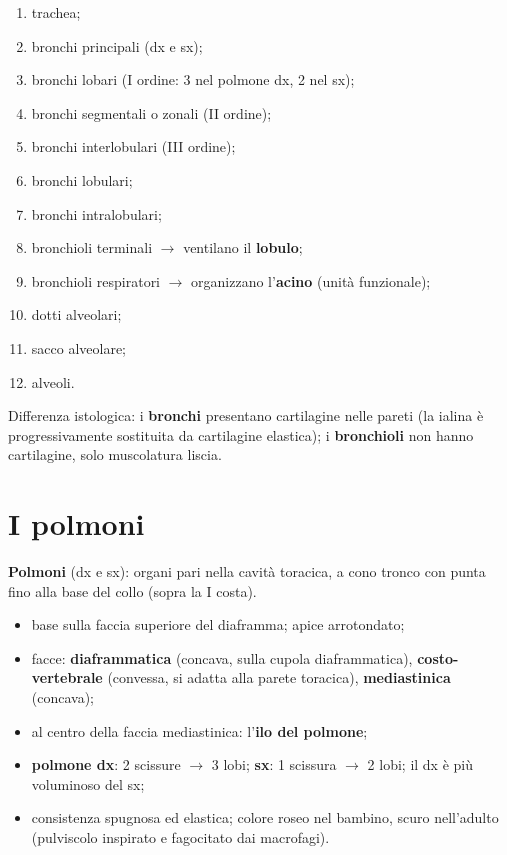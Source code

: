 \begin{enumerate}
  \item trachea;
  \item bronchi principali (dx e sx);
  \item bronchi lobari (I ordine: 3 nel polmone dx, 2 nel sx);
  \item bronchi segmentali o zonali (II ordine);
  \item bronchi interlobulari (III ordine);
  \item bronchi lobulari;
  \item bronchi intralobulari;
  \item bronchioli terminali $\rightarrow$ ventilano il \textbf{lobulo};
  \item bronchioli respiratori $\rightarrow$ organizzano l'\textbf{acino} (unità funzionale);
  \item dotti alveolari;
  \item sacco alveolare;
  \item alveoli.
\end{enumerate}
Differenza istologica: i \textbf{bronchi} presentano cartilagine nelle pareti (la ialina è
progressivamente sostituita da cartilagine elastica); i \textbf{bronchioli} non hanno cartilagine,
solo muscolatura liscia.

\section{I polmoni}

\textbf{Polmoni} (dx e sx): organi pari nella cavità toracica, a cono tronco con punta fino alla base
del collo (sopra la I costa).
\begin{itemize}
  \item base sulla faccia superiore del diaframma; apice arrotondato;
  \item facce: \textbf{diaframmatica} (concava, sulla cupola diaframmatica), \textbf{costo-vertebrale}
    (convessa, si adatta alla parete toracica), \textbf{mediastinica} (concava);
  \item al centro della faccia mediastinica: l'\textbf{ilo del polmone};
  \item \textbf{polmone dx}: 2 scissure $\rightarrow$ 3 lobi; \textbf{sx}: 1 scissura $\rightarrow$ 2
    lobi; il dx è più voluminoso del sx;
  \item consistenza spugnosa ed elastica; colore roseo nel bambino, scuro nell'adulto (pulviscolo
    inspirato e fagocitato dai macrofagi).
\end{itemize}


